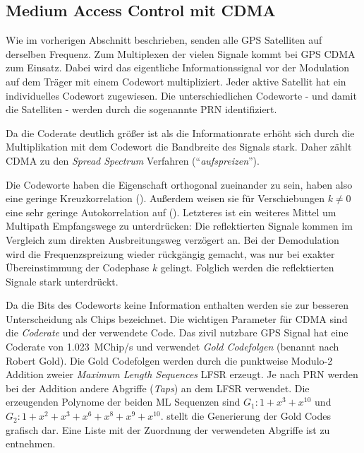 \subsection{Medium Access Control mit CDMA}
\label{basics_cdma}
Wie im vorherigen Abschnitt beschrieben, senden alle GPS Satelliten auf derselben Frequenz. Zum Multiplexen der vielen Signale kommt bei GPS \gls{CDMA} zum Einsatz. Dabei wird das eigentliche Informationssignal vor der Modulation auf dem Träger mit einem Codewort multipliziert. Jeder aktive Satellit hat ein individuelles Codewort zugewiesen. Die unterschiedlichen Codeworte - und damit die Satelliten - werden durch die sogenannte \gls{PRN} identifiziert.

Da die Coderate deutlich größer ist als die Informationrate erhöht sich durch die Multiplikation mit dem Codewort die Bandbreite des Signals stark. Daher zählt \gls{CDMA} zu den \emph{Spread Spectrum} Verfahren (\enquote{\emph{aufspreizen}}).

Die Codeworte haben die Eigenschaft orthogonal zueinander zu sein, haben also eine geringe Kreuzkorrelation (). Außerdem weisen sie für Verschiebungen $k\neq0$ eine sehr geringe Autokorrelation auf (). Letzteres ist ein weiteres Mittel um Multipath Empfangswege zu unterdrücken: Die reflektierten Signale kommen im Vergleich zum direkten Ausbreitungsweg verzögert an. Bei der Demodulation wird die Frequenzspreizung wieder rückgängig gemacht, was nur bei exakter Übereinstimmung der Codephase $k$ gelingt. Folglich werden die reflektierten Signale stark unterdrückt.





Da die Bits des Codeworts keine Information enthalten werden sie zur besseren Unterscheidung als \glspl{Chip} bezeichnet. Die wichtigen Parameter für CDMA sind die \emph{Coderate} und der verwendete Code. Das zivil nutzbare GPS Signal hat eine Coderate von \SI{1.023}{MChip/s} und verwendet \emph{Gold Codefolgen} (benannt nach Robert Gold). Die Gold Codefolgen werden durch die punktweise Modulo-2 Addition zweier \emph{Maximum Length Sequences} \gls{LFSR} erzeugt. Je nach \gls{PRN} werden bei der Addition andere Abgriffe (\emph{Taps}) an dem \gls{LFSR} verwendet. Die erzeugenden Polynome der beiden ML Sequenzen sind $G_1: 1 + x^3 + x^10$ und $G_2: 1 + x^2 + x^3 +x^6 + x^8 + x^9 + x^{10}$.  stellt die Generierung der Gold Codes grafisch dar. Eine Liste mit der Zuordnung der verwendeten Abgriffe ist \cite{specification2010gps} zu entnehmen.

